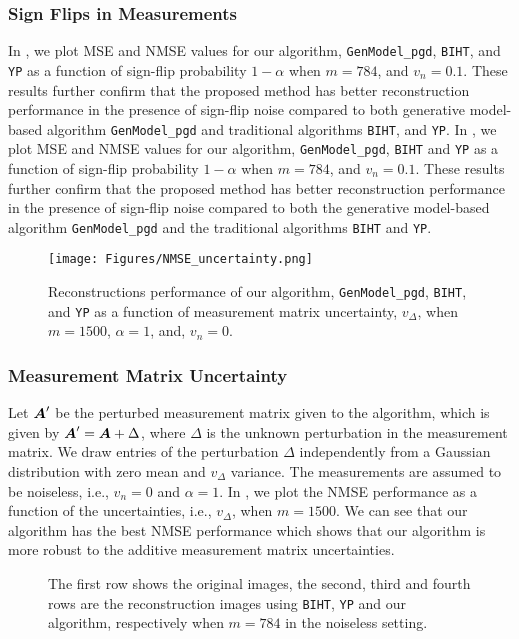 \documentclass[journal]{IEEEtran}
\begin{document}
\subsubsection{Sign Flips in Measurements}
In , we plot MSE and NMSE values for our algorithm, \texttt{GenModel\_pgd}, \texttt{BIHT}, and \texttt{YP} as a function of sign-flip probability $1-\alpha$ when $m = 784$, and $v_n=0.1$. These results further confirm that the proposed method has better reconstruction performance in the presence of sign-flip noise compared to both generative model-based algorithm \texttt{GenModel\_pgd} and traditional algorithms \texttt{BIHT}, and \texttt{YP}.
In , we plot MSE and NMSE values for our algorithm, \texttt{GenModel\_pgd}, \texttt{BIHT} and \texttt{YP} as a function of sign-flip probability $1-\alpha$ when $m = 784$, and $v_n=0.1$. These results further confirm that the proposed method has better reconstruction performance in the presence of sign-flip noise compared to both the generative model-based algorithm  \texttt{GenModel\_pgd} and the traditional algorithms \texttt{BIHT} and \texttt{YP}.
\begin{figure}
\centering
\texttt{[image: Figures/NMSE\_uncertainty.png]}
\caption{Reconstructions performance of our algorithm, \texttt{GenModel\_pgd}, \texttt{BIHT}, and \texttt{YP} as a function of measurement matrix uncertainty, $v_\Delta$, when $m = 1500$, $\alpha=1$, and,  $v_n = 0$.}
\label{fig:uncertainties}
\end{figure}

\subsubsection{Measurement Matrix Uncertainty}
Let  $\boldsymbol{A}^\prime$ be the perturbed measurement matrix given to the algorithm, which is given by
$\boldsymbol{A}^\prime =  \boldsymbol{A} + \Delta$, where $\Delta$ is the unknown perturbation in the measurement matrix. We draw entries of the perturbation $\Delta$ independently from a Gaussian distribution with zero mean and  $v_\Delta$ variance. The measurements are assumed to be noiseless, i.e., $v_n = 0$ and $\alpha=1$. In , we plot the NMSE performance as a function of the uncertainties, i.e., $v_\Delta$, when $m=1500$. We can see that our algorithm has the best NMSE performance which shows that our algorithm is more robust to the additive measurement matrix uncertainties. 
\begin{figure*}
\caption{The first row shows the original images, the second, third and fourth rows are the reconstruction images using \texttt{BIHT}, \texttt{YP} and our algorithm, respectively when $m = 784$ in the noiseless setting.}
		\label{fig:reconstructionImages}
\end{figure*}
\end{document}
